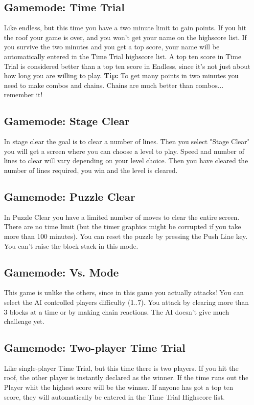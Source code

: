 \documentclass[11pt,a4paper]{article}
\begin{document}
\subsection{Gamemode: Time Trial}
Like endless, but this time you have a two minute limit to gain
points. If you hit the roof your game is over, and you won't get
your name on the highscore list. If you survive the two minutes
and you get a top score, your name will be automatically entered
in the Time Trial highscore list. A top ten score in Time Trial is
considered better than a top ten score in Endless, since it's not
just about how long you are willing to play. \newline
\textbf{Tip:} To get many points in two minutes you need to make
combos and chains. Chains are much better than combos... remember
it!
\subsection{Gamemode: Stage Clear}
In stage clear the goal is to clear a number of lines. Then you
select "Stage Clear" you will get a screen where you can choose a
level to play. Speed and number of lines to clear will vary
depending on your level choice. Then you have cleared the number
of lines required, you win and the level is cleared.
\subsection{Gamemode: Puzzle Clear}
In Puzzle Clear you have a limited number of moves to clear the
entire screen. There are no time limit (but the timer graphics
might be corrupted if you take more than 100 minutes). You can
reset the puzzle by pressing the Push Line key. You can't raise
the block stack in this mode.
\subsection{Gamemode: Vs. Mode}
This game is unlike the others, since in this game you actually attacks! You can select the AI controlled players difficulty (1..7). You attack by clearing more than 3 blocks at a time or by making chain reactions. The AI doesn't give much challenge yet.
\subsection{Gamemode: Two-player Time Trial}
Like single-player Time Trial, but this time there is two players.
If you hit the roof, the other player is instantly declared as the
winner. If the time runs out the Player whit the highest score
will be the winner. If anyone has got a top ten score, they will
automatically be entered in the Time Trial Highscore list.
\end{document}
